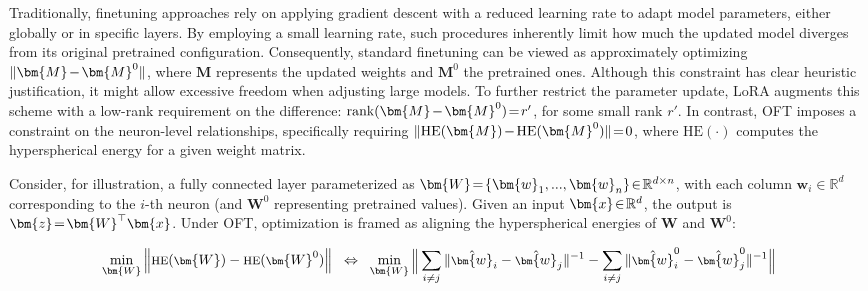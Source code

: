 Traditionally, finetuning approaches rely on applying gradient descent with a reduced learning rate to adapt model parameters, either globally or in specific layers. By employing a small learning rate, such procedures inherently limit how much the updated model diverges from its original pretrained configuration. Consequently, standard finetuning can be viewed as approximately optimizing $\thickmuskip=2mu \medmuskip=2mu \| \bm{M} - \bm{M}^0\|$, where $\bm{M}$ represents the updated weights and $\bm{M}^0$ the pretrained ones. Although this constraint has clear heuristic justification, it might allow excessive freedom when adjusting large models. To further restrict the parameter update, LoRA augments this scheme with a low-rank requirement on the difference: $\thickmuskip=2mu \medmuskip=2mu \text{rank}(\bm{M} - \bm{M}^0)=r'$, for some small rank $r'$. In contrast, OFT imposes a constraint on the neuron-level relationships, specifically requiring $\thickmuskip=2mu \medmuskip=2mu \| \text{HE}(\bm{M})-\text{HE}(\bm{M}^0) \|=0$, where $\text{HE}(\cdot)$ computes the hyperspherical energy for a given weight matrix.

Consider, for illustration, a fully connected layer parameterized as $\thickmuskip=2mu \medmuskip=2mu \bm{W} = \{\bm{w}_1, ..., \bm{w}_n\} \in \mathbb{R}^{d \times n}$, with each column $\bm{w}_i \in \mathbb{R}^d$ corresponding to the $i$-th neuron (and $\bm{W}^0$ representing pretrained values). Given an input $\thickmuskip=2mu \medmuskip=2mu \bm{x} \in \mathbb{R}^d$, the output is $\thickmuskip=2mu \medmuskip=2mu \bm{z} = \bm{W}^\top \bm{x}$. Under OFT, optimization is framed as aligning the hyperspherical energies of $\bm{W}$ and $\bm{W}^0$:

\begin{equation}\label{eq:oft_principle}
\footnotesize
\min_{\bm{W}} \left\| \text{HE}(\bm{W})-\text{HE}(\bm{W}^0)\right\|~~\Leftrightarrow~~\min_{\bm{W}} \bigg{\|} \sum_{i\neq j} \|\hat{\bm{w}}_i-\hat{\bm{w}}_j\|^{-1}-\sum_{i\neq j} \|\hat{\bm{w}}^0_i-\hat{\bm{w}}^0_j\|^{-1}\bigg{\|}
\end{equation}

